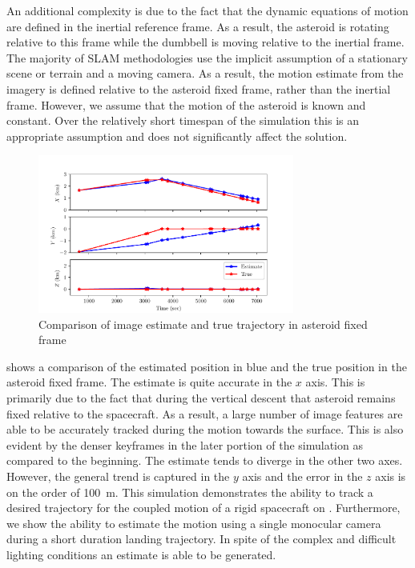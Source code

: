 \documentclass[letterpaper, paper,11pt]{AAS}		%
\begin{document}
An additional complexity is due to the fact that the dynamic equations of motion are defined in the inertial reference frame. 
As a result, the asteroid is rotating relative to this frame while the dumbbell is moving relative to the inertial frame. 
The majority of SLAM methodologies use the implicit assumption of a stationary scene or terrain and a moving camera. 
As a result, the motion estimate from the imagery is defined relative to the asteroid fixed frame, rather than the inertial frame. 
However, we assume that the motion of the asteroid is known and constant. 
Over the relatively short timespan of the simulation this is an appropriate assumption and does not significantly affect the solution.
\begin{figure}[htbp]
    \centering
    \includegraphics[width=0.75\textwidth,keepaspectratio]{figures/keyframe_estimate.pdf}
    \caption{Comparison of image estimate and true trajectory in asteroid fixed frame\label{fig:estimate}}
\end{figure}
 shows a comparison of the estimated position in blue and the true position in the asteroid fixed frame. 
The estimate is quite accurate in the \( x \) axis. 
This is primarily due to the fact that during the vertical descent that asteroid remains fixed relative to the spacecraft. 
As a result, a large number of image features are able to be accurately tracked during the motion towards the surface. 
This is also evident by the denser keyframes in the later portion of the simulation as compared to the beginning. 
The estimate tends to diverge in the other two axes.
However, the general trend is captured in the \( y \) axis and the error in the \( z \) axis is on the order of \SI{100}{\meter}. 
This simulation demonstrates the ability to track a desired trajectory for the coupled motion of a rigid spacecraft on \SE.
Furthermore, we show the ability to estimate the motion using a single monocular camera during a short duration landing trajectory. 
In spite of the complex and difficult lighting conditions an estimate is able to be generated.
\end{document}
